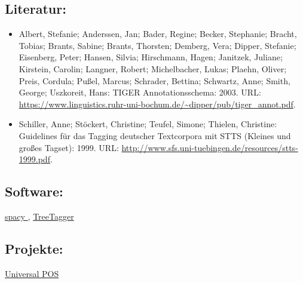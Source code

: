 \documentclass{article}
\begin{document}
        \subsection*{Literatur:}\begin{itemize}\item Albert, Stefanie; Anderssen, Jan; Bader, Regine; Becker, Stephanie; Bracht, Tobias; Brants, Sabine; Brants, Thorsten; Demberg, Vera; Dipper, Stefanie; Eisenberg, Peter; Hansen, Silvia; Hirschmann, Hagen; Janitzek, Juliane; Kirstein, Carolin; Langner, Robert; Michelbacher, Lukas; Plaehn, Oliver; Preis, Cordula; Pußel, Marcus; Schrader, Bettina; Schwartz, Anne; Smith, George; Uszkoreit, Hans: TIGER Annotationsschema: 2003. URL: \url{https://www.linguistics.ruhr-uni-bochum.de/~dipper/pub/tiger_annot.pdf}.\item Schiller, Anne; Stöckert, Christine; Teufel, Simone; Thielen, Christine: Guidelines für das Tagging deutscher Textcorpora mit
                              STTS (Kleines und großes Tagset): 1999. URL: \url{http://www.sfs.uni-tuebingen.de/resources/stts-1999.pdf}.\end{itemize}\subsection*{Software:}\href{https://spacy.io/}{spacy }, \href{https://www.cis.uni-muenchen.de/~schmid/tools/TreeTagger/}{TreeTagger}\subsection*{Projekte:}\href{https://universaldependencies.org/u/pos/all.html}{Universal POS
}
\end{document}
